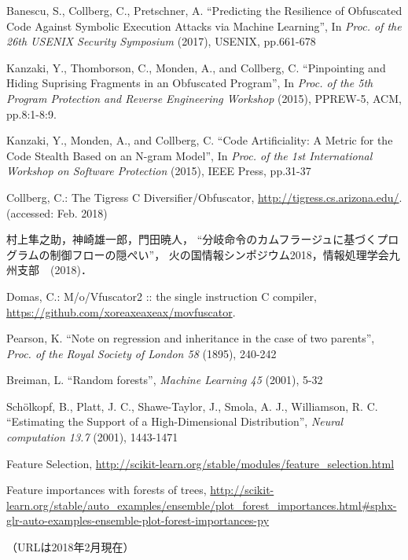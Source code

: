 \documentclass[12pt]{jarticle}
\begin{document}
\newpage

\renewcommand{\refname}{参考文献・参考URL}
\begin{thebibliography}{9}
Banescu, S., Collberg, C., Pretschner, A.
``Predicting the Resilience of Obfuscated Code Against Symbolic Execution Attacks via Machine Learning'',
In \textit{Proc. of the 26th USENIX Security Symposium} (2017), USENIX, pp.661-678

Kanzaki, Y., Thomborson, C., Monden, A., and Collberg, C.
``Pinpointing and Hiding Suprising Fragments in an Obfuscated Program'',
In \textit{Proc. of the 5th Program Protection and Reverse Engineering Workshop} (2015), PPREW-5, ACM, pp.8:1-8:9.

Kanzaki, Y., Monden, A., and Collberg, C.
``Code Artificiality: A Metric for the Code Stealth Based on an N-gram Model'',
In \textit{Proc. of the 1st International Workshop on Software Protection} (2015), IEEE Press, pp.31-37

Collberg, C.: The Tigress C Diversifier/Obfuscator,
\url{http://tigress.cs.arizona.edu/}. (accessed: Feb. 2018)

村上隼之助，神崎雄一郎，門田暁人， 
``分岐命令のカムフラージュに基づくプログラムの制御フローの隠ぺい''，
火の国情報シンポジウム2018，情報処理学会九州支部　(2018)．

Domas, C.: M/o/Vfuscator2 :: the single instruction C compiler,
\url{https://github.com/xoreaxeaxeax/movfuscator}.

Pearson, K.
``Note on regression and inheritance in the case of two parents'',
\textit{Proc. of the Royal Society of London 58} (1895), 240-242

Breiman, L.
``Random forests'',
\textit{Machine Learning 45} (2001), 5-32

Sch\"{o}lkopf, B., Platt, J. C., Shawe-Taylor, J., Smola, A. J., Williamson, R. C.
``Estimating the Support of a High-Dimensional Distribution'',
\textit{Neural computation 13.7} (2001), 1443-1471

Feature Selection, 
\url{http://scikit-learn.org/stable/modules/feature_selection.html}

Feature importances with forests of trees, 
\url{http://scikit-learn.org/stable/auto_examples/ensemble/plot_forest_importances.html#sphx-glr-auto-examples-ensemble-plot-forest-importances-py}

\end{thebibliography}
\noindent （URLは2018年2月現在）
\end{document}
